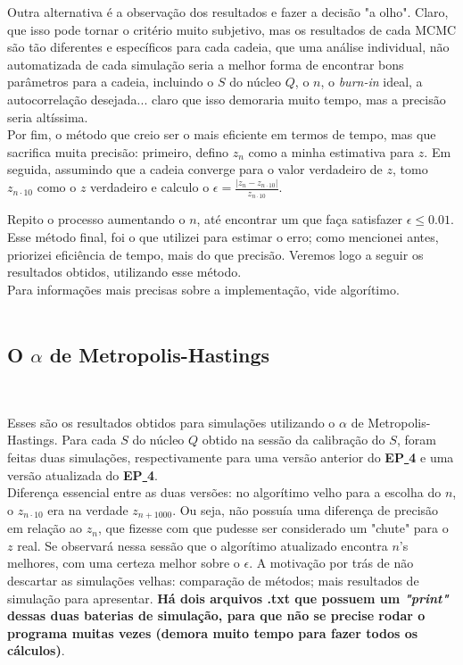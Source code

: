 \documentclass[pt12]{article}
\begin{document}
\indent Outra alternativa é a observação dos resultados e fazer a decisão "a olho". Claro, que isso pode tornar o critério muito subjetivo, mas os resultados de cada MCMC são tão diferentes e específicos para cada cadeia, que uma análise individual, não automatizada de cada simulação seria a melhor forma de encontrar bons parâmetros para a cadeia, incluindo o $S$ do núcleo $Q$, o $n$, o \textit{burn-in} ideal, a autocorrelação desejada... claro que isso demoraria muito tempo, mas a precisão seria altíssima.\\

\indent Por fim, o método que creio ser o mais eficiente em termos de tempo, mas que sacrifica muita precisão: primeiro, defino $z_n$ como a minha estimativa para $z$. Em seguida, assumindo que a cadeia converge para o valor verdadeiro de $z$, tomo $z_{n\cdot 10}$ como o $z$ verdadeiro e calculo o $\displaystyle{\epsilon = \frac{|z_n - z_{n\cdot 10}|}{z_{n\cdot 10}}}$.\\
\newpage

\noindent Repito o processo aumentando o $n$, até encontrar um que faça satisfazer $\epsilon \leq 0.01$. Esse método final, foi o que utilizei para estimar o erro; como mencionei antes, priorizei eficiência de tempo, mais do que precisão. Veremos logo a seguir os resultados obtidos, utilizando esse método.\\
Para informações mais precisas sobre a implementação, vide algorítimo.\\
\


\subsection{O $\alpha$ de Metropolis-Hastings}
\ 

Esses são os resultados obtidos para simulações utilizando o $\alpha$ de Metropolis-Hastings. Para cada $S$ do núcleo $Q$ obtido na sessão da calibração do $S$, foram feitas duas simulações, respectivamente para uma versão anterior do \textbf{EP\underline{ }4} e uma versão atualizada do \textbf{EP\underline{ }4}.\\
Diferença essencial entre as duas versões: no algorítimo velho para a escolha do $n$, o $z_{n\cdot 10}$ era na verdade $z_{n+1000}$. Ou seja, não possuía uma diferença de precisão em relação ao $z_{n}$, que fizesse com que pudesse ser considerado um "chute" para o $z$ real. Se observará nessa sessão que o algorítimo atualizado encontra $n$'s melhores, com uma certeza melhor sobre o $\epsilon$. A motivação por trás de não descartar as simulações velhas: comparação de métodos; mais resultados de simulação para apresentar. \textbf{Há dois arquivos .txt que possuem um \textit{"print"} dessas duas baterias de simulação, para que não se precise rodar o programa muitas vezes (demora muito tempo para fazer todos os cálculos)}.\\
\ 
\end{document}
